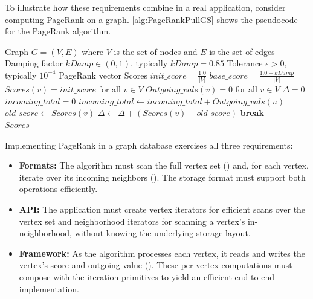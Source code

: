 To illustrate how these requirements combine in a real application, consider computing PageRank on a graph.
\autoref{alg:PageRankPullGS} shows the pseudocode for the PageRank algorithm.
\begin{algorithm}
  \begin{algorithmic}[1]
  \Require Graph $G = (V,E)$ where $V$ is the set of nodes and $E$ is the set of edges
  \Require Damping factor $kDamp \in (0, 1)$, typically $kDamp = 0.85$
  \Require Tolerance $\epsilon > 0$, typically $10^{-4}$
  \Ensure PageRank vector Scores
  \State $init\_score = \frac{1.0}{|V|}$
  \State $base\_score = \frac{1.0 - kDamp}{|V|}$
  \State $Scores(v) = init\_score$ for all $v \in V$
  \State $Outgoing\_vals(v) = 0$ for all $v \in V$
      \State {}
  \EndFor
      \State $\Delta = 0$
          \State $incoming\_total = 0$
              \State $incoming\_total \gets incoming\_total + Outgoing\_vals(u)$
          \EndFor
          \State $old\_score \gets Scores(v)$
          \State {}
          \State $\Delta \gets \Delta + (Scores(v) - old\_score)$
          \State {}
      \EndFor
      \If{$\Delta < \epsilon$}
          \State \textbf{break}
      \EndIf
  \EndFor \\
  \Return $Scores$
  \end{algorithmic}
  \caption{PageRank Algorithm as specified in the GAP Benchmark~\cite{beamer2015gap}: this variant allows new values to be immediately visible (Gauss--Seidel style). The highlighted lines indicate different access patterns: , , and access to . For a vertex $v$, $N^+(v)$ denotes its out-neighborhood, and $N^-(v)$ its in-neighborhood.}
  \label{alg:PageRankPullGS}
  \end{algorithm}

Implementing PageRank in a graph database exercises all three requirements:
\begin{itemize}
\item \textbf{Formats:} The algorithm must scan the full vertex set () and, for each vertex, iterate over its incoming neighbors (). The storage format must support both operations efficiently.
\item \textbf{API:} The application must create vertex iterators for efficient scans over the vertex set and neighborhood iterators for scanning a vertex's in-neighborhood, without knowing the underlying storage layout.
\item \textbf{Framework:} As the algorithm processes each vertex, it reads and writes the vertex's score and outgoing value (). These per-vertex computations must compose with the iteration primitives to yield an efficient end-to-end implementation.
\end{itemize}

